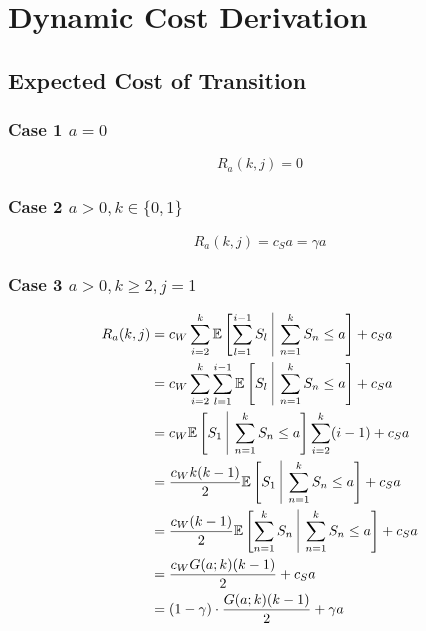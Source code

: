 \chapter{Dynamic Cost Derivation}

\section{Expected Cost of Transition}
\subsection{Case 1 $a = 0$}

\begin{equation*}
	R_{a} (k, j) = 0
\end{equation*}

\subsection{Case 2 $a > 0, k \in \{ 0, 1 \}$}

\begin{equation*}
	R_{a} (k, j) = c_{S} a = \gamma a
\end{equation*}

\subsection{Case 3 $a > 0, k \geq 2, j = 1$}

\begin{align*}
	R_{a} (k, j) & = c_{W} \sum_{i = 2}^{k} \mathbb{E} \left[ \sum_{l = 1}^{i - 1} S_{l} \ \vline \ \sum_{n = 1}^{k} S_{n} \leq a \right] + c_{S} a \\
	& = c_{W} \sum_{i = 2}^{k} \sum_{l = 1}^{i - 1} \mathbb{E} \left[ S_{l} \ \vline \ \sum_{n = 1}^{k} S_{n} \leq a \right] + c_{S} a \\
	& = c_{W} \mathbb{E} \left[ S_{1} \ \vline \ \sum_{n = 1}^{k} S_{n} \leq a \right] \sum_{i = 2}^{k} (i - 1) + c_{S} a \\
	& = \frac{c_{W} k (k - 1)}{2} \mathbb{E} \left[ S_{1} \ \vline \ \sum_{n = 1}^{k} S_{n} \leq a \right] + c_{S} a \\
	& = \frac{c_{W} (k - 1)}{2} \mathbb{E} \left[ \sum_{n = 1}^{k} S_{n} \ \vline \ \sum_{n = 1}^{k} S_{n} \leq a \right] + c_{S} a \\
	& = \frac{c_{W} G (a; k) (k - 1)}{2} + c_{S} a \\
	& = (1 - \gamma) \cdot \frac{G (a; k) (k - 1)}{2} + \gamma a
\end{align*}

